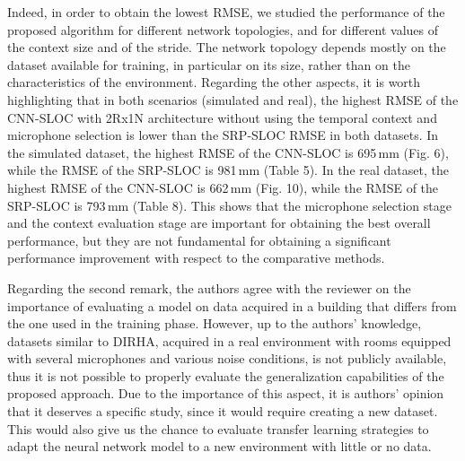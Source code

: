\documentclass[11pt, technote, letterpaper, oneside, onecolumn]{IEEEtran}
\begin{document}
\begin{enumerate}
 Indeed, in order to obtain the lowest RMSE, we studied the performance of the proposed algorithm for different network topologies, and for different values of the context size and of the stride. The network topology depends mostly on the dataset available for training, in particular on its size, rather than on the characteristics of the environment. Regarding the other aspects, it is worth highlighting that in both scenarios (simulated and real), the highest RMSE of the CNN-SLOC with 2Rx1N architecture without using the temporal context and microphone selection is lower than the SRP-SLOC RMSE in both datasets. In the simulated dataset, the highest RMSE of the CNN-SLOC is 695\,mm (Fig. 6), while the RMSE of the SRP-SLOC is 981\,mm (Table 5). In the real dataset, the highest RMSE of the CNN-SLOC is 662\,mm (Fig. 10), while the RMSE of the SRP-SLOC is 793\,mm (Table 8). This shows that the microphone selection stage and the context evaluation stage are important for obtaining the best overall performance, but they are not fundamental for obtaining a significant performance improvement with respect to the comparative methods.
 
 


Regarding the second remark, the authors agree with the reviewer on the importance of evaluating a model on data acquired in a building that differs from the one used in the training phase. However, up to the authors' knowledge, datasets similar to DIRHA, acquired in a real environment with rooms equipped with several microphones and various noise conditions, is not publicly available, thus it is not possible to properly evaluate the generalization capabilities of the proposed approach. Due to the importance of this aspect, it is authors' opinion that it deserves a specific study, since it would require creating a new dataset. This would also give us the chance to evaluate transfer learning strategies to adapt the neural network model to a new environment with little or no data. 


\end{enumerate}
\end{document}
